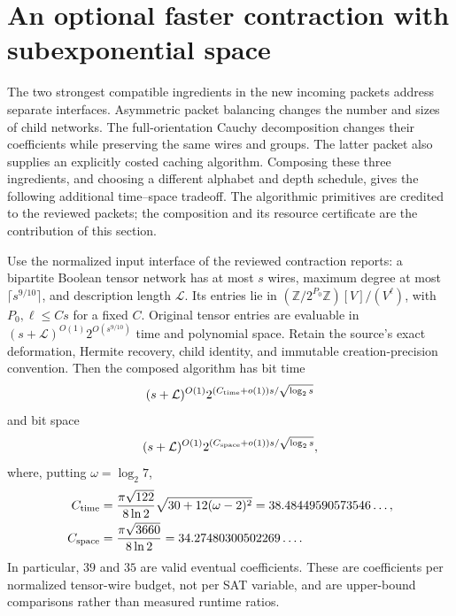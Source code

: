 \section{An optional faster contraction with subexponential space}
\label{sec:cached-composition}

The two strongest compatible ingredients in the new incoming packets address
separate interfaces.  Asymmetric packet balancing changes the number and sizes
of child networks.  The full-orientation Cauchy decomposition changes their
coefficients while preserving the same wires and groups.  The latter packet
also supplies an explicitly costed caching algorithm.  Composing these three
ingredients, and choosing a different alphabet and depth schedule, gives the
following additional time--space tradeoff.  The algorithmic primitives are
credited to the reviewed packets; the composition and its resource certificate
are the contribution of this section.

\begin{theorem}
\label{thm:cached-eight}
Use the normalized input interface of the reviewed contraction reports:
a bipartite Boolean tensor network has at most $s$ wires, maximum degree at
most $\lceil s^{9/10}\rceil$, and description length $\mathcal L$.
Its entries lie in $(\mathbb Z/2^{P_0}\mathbb Z)[V]/(V^\ell)$, with
$P_0,\ell\le Cs$ for a fixed $C$.  Original tensor entries are evaluable
in $(s+\mathcal L)^{O(1)}2^{O(s^{9/10})}$ time and polynomial space.
Retain the source's exact deformation, Hermite recovery, child identity,
and immutable creation-precision convention.
Then the composed algorithm has bit time
\[
 (s+\mathcal L)^{O(1)}
 2^{(C_{\rm time}+o(1))s/\sqrt{\log_2s}}
\]
and bit space
\[
 (s+\mathcal L)^{O(1)}
 2^{(C_{\rm space}+o(1))s/\sqrt{\log_2s}},
\]
where, putting $\omega=\log_2 7$,
\begin{align*}
 C_{\rm time}
 &=\frac{\pi\sqrt{122}}{8\ln 2}
       \sqrt{30+12(\omega-2)^2}
   =38.48449590573546\ldots,\\
 C_{\rm space}
 &=\frac{\pi\sqrt{3660}}{8\ln 2}
   =34.27480300502269\ldots.
\end{align*}
In particular, $39$ and $35$ are valid eventual coefficients.
These are coefficients per normalized tensor-wire budget, not per SAT variable,
and are upper-bound comparisons rather than measured runtime ratios.
\end{theorem}

